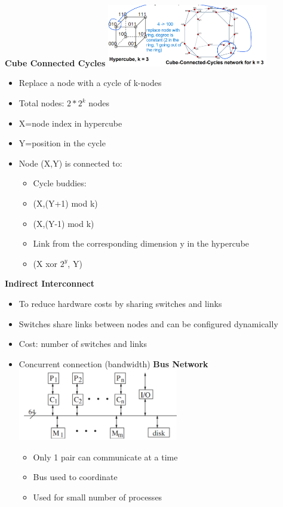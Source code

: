 \documentclass[10pt, landscape]{article}
\begin{document}
\begin{multicols}{4}
\textbf{Cube Connected Cycles}
\includegraphics*[width=7cm]{ccc.png}
\begin{itemize}
    \item Replace a node with a cycle of k-nodes 
    \item Total nodes: $2*2^k$ nodes 
    \item X=node index in hypercube 
    \item Y=position in the cycle 
    \item Node (X,Y) is connected to: 
    \begin{itemize}
        \item Cycle buddies:
        \item (X,(Y+1) mod k)
        \item (X,(Y-1) mod k)
        \item Link from the corresponding dimension y in the hypercube
        \item (X xor $2^{y}$, Y)
    \end{itemize}
\end{itemize}

\textbf{Indirect Interconnect}
\begin{itemize}
  \item To reduce hardware costs by sharing switches and links 
  \item Switches share links between nodes and can be configured dynamically 
  \item Cost: number of switches and links 
  \item Concurrent connection (bandwidth)
  \textbf{Bus Network}
  \includegraphics*[width=7cm]{bus_network.png}
  \begin{itemize}
    \item Only 1 pair can communicate at a time
    \item Bus used to coordinate 
    \item Used for small number of processes
  \end{itemize}
\end{itemize}
    

\end{multicols}
\end{document}
